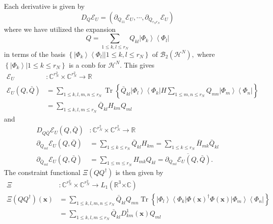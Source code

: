 \documentclass[aps,preprint]{revtex4}%
\begin{document}
Each derivative is given by
\begin{equation}
D_{Q}\mathcal{E}_{U}=\left(  \partial_{Q_{11}}\mathcal{E}_{U},\cdots
,\partial_{Q_{r_{N}r_{N}}}\mathcal{E}_{U}\right)
\end{equation}
where we have utilized the expansion
\begin{equation}
Q=\sum_{1\leq k,l\leq r_{N}}Q_{kl}\left\vert \Phi_{k}\right\rangle
\left\langle \Phi_{l}\right\vert
\end{equation}
in terms of the basis $\left\{  \left.  \left\vert \Phi_{k}\right\rangle
\left\langle \Phi_{l}\right\vert \right\vert 1\leq k,l\leq r_{N}\right\}  $ of
$\mathcal{B}_{2}\left(  \mathcal{H}^{N}\right)  ,$ where $\left\{  \left.
\left\vert \Phi_{k}\right\rangle \right\vert 1\leq k\leq r_{N}\right\}  $ is a
conb for $\mathcal{H}^{N}.$ This gives
\begin{align}
\mathcal{E}_{U}  &  :\mathbb{C}^{r_{N}^{2}}\times\mathbb{C}^{r_{N}^{2}%
}\rightarrow\mathbb{R}\nonumber\\
\mathcal{E}_{U}\left(  Q,\bar{Q}\right)   &  =\sum_{1\leq k,l,m,n\leq r_{N}%
}\operatorname{Tr}\left\{  \bar{Q}_{kl}\left\vert \Phi_{l}\right\rangle
\left\langle \Phi_{k}\right\vert H\sum_{1\leq m,n\leq r_{N}}Q_{mn}\left\vert
\Phi_{m}\right\rangle \left\langle \Phi_{n}\right\vert \right\} \nonumber\\
&  =\sum_{1\leq k,l,m\leq r_{N}}\bar{Q}_{kl}H_{km}Q_{ml}%
\end{align}
and
\begin{align}
D_{Q\bar{Q}}\mathcal{E}_{U}\left(  Q,\bar{Q}\right)   &  :\mathbb{C}%
^{r_{N}^{2}}\times\mathbb{C}^{r_{N}^{2}}\rightarrow\mathbb{R}\nonumber\\
\partial_{Q_{ml}}\mathcal{E}_{U}\left(  Q,\bar{Q}\right)   &  =\sum_{1\leq
k\leq r_{N}}\bar{Q}_{kl}H_{km}=\sum_{1\leq k\leq r_{N}}\bar{H}_{mk}\bar
{Q}_{kl}\nonumber\\
\partial_{\bar{Q}_{ml}}\mathcal{E}_{U}\left(  Q,\bar{Q}\right)   &
=\sum_{1\leq m\leq r_{N}}H_{mk}Q_{kl}=\overline{\partial_{Q_{ml}}%
\mathcal{E}_{U}\left(  Q,\bar{Q}\right)  }.
\end{align}
The constraint functional $\Xi\left(  QQ^{\dagger}\right)  $ is then given by
\begin{align}
\Xi &  :\mathbb{C}^{r_{N}^{2}}\times\mathbb{C}^{r_{N}^{2}}\rightarrow
L_{1}\left(  \mathbb{R}^{3}\mathbb{\times C}\right) \nonumber\\
\Xi\left(  QQ^{\dagger}\right)  \left(  \mathbf{x}\right)   &  =\sum_{1\leq
k,l,m,n\leq r_{N}}\bar{Q}_{kl}Q_{mn}\operatorname{Tr}\left\{  \left\vert
\Phi_{l}\right\rangle \left\langle \Phi_{k}\right\vert \Phi\left(
\mathbf{x}\right)  ^{\dagger}\Phi\left(  \mathbf{x}\right)  \left\vert
\Phi_{m}\right\rangle \left\langle \Phi_{n}\right\vert \right\} \nonumber\\
&  =\sum_{1\leq k,l,m\leq r_{N}}\bar{Q}_{kl}D_{km}^{1}\left(  \mathbf{x}%
\right)  Q_{ml}%
\end{align}
\end{document}
